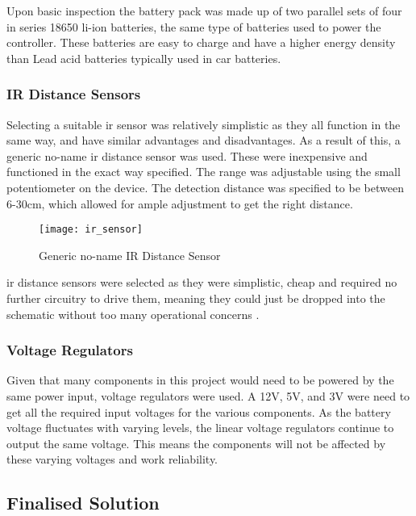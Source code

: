 \documentclass [12pt]{article}
\begin{document}
Upon basic inspection the battery pack was made up of two parallel sets of four in series 18650 \gls{li-ion} batteries, the same type of batteries used to power the controller. These batteries are easy to charge and have a higher energy density than Lead acid batteries typically used in car batteries. 

\subsubsection{IR Distance Sensors}

Selecting a suitable \gls{ir} sensor was relatively simplistic as they all function in the same way, and have similar advantages and disadvantages. As a result of this, a generic no-name \gls{ir} distance sensor was used. These were inexpensive and functioned in the exact way specified. The range was adjustable using the small potentiometer on the device. The detection distance was specified to be between 6-30cm, which allowed for ample adjustment to get the right distance. 

\begin{figure}[H]
\centerline{\texttt{[image: ir\_sensor]}}
\caption{Generic no-name IR Distance Sensor}
\label{fig:ir_sensor}
\end{figure}

\gls{ir} distance sensors were selected as they were simplistic, cheap and required no further circuitry to drive them, meaning they could just be dropped into the schematic without too many operational concerns \cite{IR_distance_sensor}. 

\subsubsection{Voltage Regulators}

Given that many components in this project would need to be powered by the same power input, voltage regulators were used. A 12V, 5V, and 3V were need to get all the required input voltages for the various components. As the battery voltage fluctuates with varying levels, the linear voltage regulators continue to output the same voltage. This means the components will not be affected by these varying voltages and work reliability.

\subsection{Finalised Solution}
\end{document}
